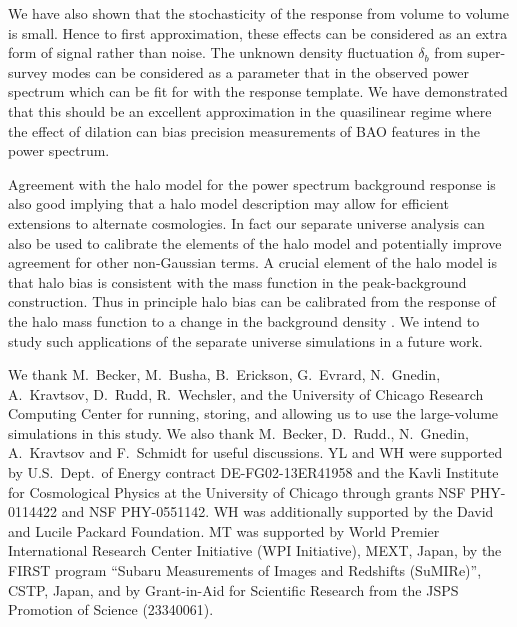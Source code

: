 \documentclass[prd,twocolumn,amsmath,amssymb,floatfix,superscriptaddress]{revtex4-1}
\begin{document}
We have also shown that the stochasticity of the response from volume to volume is small.
Hence to first approximation, these effects can be considered as an extra form of signal
rather than noise.   The unknown density fluctuation $\delta_b$ from super-survey modes
can be considered as a parameter that in the observed power spectrum which can be fit
for with the response template.    We have demonstrated that this should be an excellent
approximation in the quasilinear regime where the effect of dilation can bias precision measurements of BAO features in the power spectrum.



Agreement with the halo model for the power spectrum background response is also good implying that
a halo model description may allow for efficient extensions to 
alternate cosmologies.  In fact our separate universe analysis can also be used
to calibrate the elements of the halo model {and potentially improve agreement
for other non-Gaussian terms.     A crucial element of
the halo model is that halo bias is consistent with the mass function in the 
peak-background construction.}   Thus in principle halo bias can be calibrated from the
response of the halo mass function to a change in the background density
\cite{Schmidtetal:13}.   We intend to study such applications of the separate universe
simulations in a future work.



We thank M.\ Becker, M.\ Busha, B.\ Erickson,  G.\ Evrard, N.\ Gnedin,  A.\ Kravtsov,
D.\ Rudd,  R.\ Wechsler,  and the University of Chicago
Research Computing Center   for running, storing, and
allowing us to use the large-volume simulations in this study. 
{We also thank M.\ Becker, D.\ Rudd., N.\ Gnedin, A.\ Kravtsov and F.\ Schmidt for useful discussions.}
YL and WH  were supported
 by U.S.~Dept.\ of Energy
 contract DE-FG02-13ER41958
 and the
 Kavli Institute for Cosmological Physics at the University of
 Chicago through grants NSF PHY-0114422 and NSF PHY-0551142.   WH was additionally
 supported by the David and Lucile Packard Foundation. 
MT was supported by World
 Premier International Research Center Initiative (WPI Initiative),
 MEXT, Japan, by the FIRST program ``Subaru Measurements of Images and
 Redshifts (SuMIRe)'', CSTP, Japan, and by Grant-in-Aid for
 Scientific Research from the JSPS Promotion of Science (23340061).
 \vfill

\vfill
\end{document}

